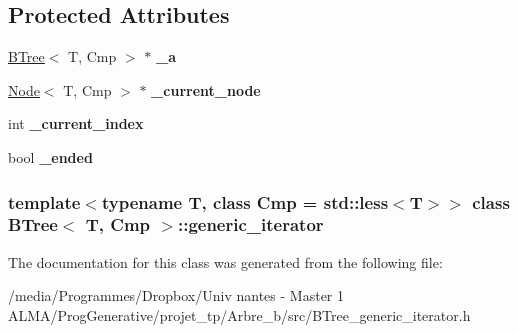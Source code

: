 \subsection*{Protected Attributes}
\begin{DoxyCompactItemize}
\item 
\hypertarget{classBTree_1_1generic__iterator_ad64762fec58ac00d5ae5bbc672ed3a8a}{
\hyperlink{classBTree}{BTree}$<$ T, Cmp $>$ $\ast$ {\bfseries \_\-a}}
\label{classBTree_1_1generic__iterator_ad64762fec58ac00d5ae5bbc672ed3a8a}

\item 
\hypertarget{classBTree_1_1generic__iterator_a1f7da8be7535fa4a1ec4660344667053}{
\hyperlink{classNode}{Node}$<$ T, Cmp $>$ $\ast$ {\bfseries \_\-current\_\-node}}
\label{classBTree_1_1generic__iterator_a1f7da8be7535fa4a1ec4660344667053}

\item 
\hypertarget{classBTree_1_1generic__iterator_a198038019db667a9701f2f743158fbd3}{
int {\bfseries \_\-current\_\-index}}
\label{classBTree_1_1generic__iterator_a198038019db667a9701f2f743158fbd3}

\item 
\hypertarget{classBTree_1_1generic__iterator_a27a84badd0cbebab7e8eb85322e044cd}{
bool {\bfseries \_\-ended}}
\label{classBTree_1_1generic__iterator_a27a84badd0cbebab7e8eb85322e044cd}

\end{DoxyCompactItemize}
\subsubsection*{template$<$typename T, class Cmp = std::less$<$T$>$$>$ class BTree$<$ T, Cmp $>$::generic\_\-iterator}



The documentation for this class was generated from the following file:\begin{DoxyCompactItemize}
\item 
/media/Programmes/Dropbox/Univ nantes -\/ Master 1 ALMA/ProgGenerative/projet\_\-tp/Arbre\_\-b/src/BTree\_\-generic\_\-iterator.h\end{DoxyCompactItemize}
